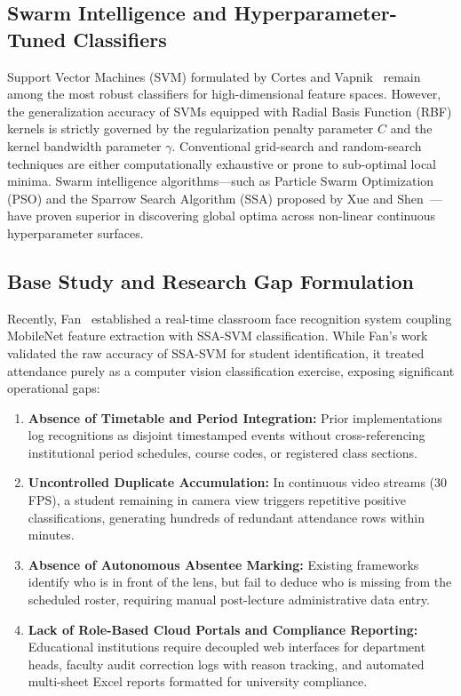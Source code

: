 \documentclass[conference]{IEEEtran}
\begin{document}
\subsection{Swarm Intelligence and Hyperparameter-Tuned Classifiers}
Support Vector Machines (SVM) formulated by Cortes and Vapnik~\cite{cortes1995support} remain among the most robust classifiers for high-dimensional feature spaces. However, the generalization accuracy of SVMs equipped with Radial Basis Function (RBF) kernels is strictly governed by the regularization penalty parameter $C$ and the kernel bandwidth parameter $\gamma$. Conventional grid-search and random-search techniques are either computationally exhaustive or prone to sub-optimal local minima. Swarm intelligence algorithms---such as Particle Swarm Optimization (PSO) and the Sparrow Search Algorithm (SSA) proposed by Xue and Shen~\cite{xue2020novel}---have proven superior in discovering global optima across non-linear continuous hyperparameter surfaces.

\subsection{Base Study and Research Gap Formulation}
Recently, Fan~\cite{fan2026classroom} established a real-time classroom face recognition system coupling MobileNet feature extraction with SSA-SVM classification. While Fan's work validated the raw accuracy of SSA-SVM for student identification, it treated attendance purely as a computer vision classification exercise, exposing significant operational gaps:
\begin{enumerate}
    \item \textbf{Absence of Timetable and Period Integration:} Prior implementations log recognitions as disjoint timestamped events without cross-referencing institutional period schedules, course codes, or registered class sections.
    \item \textbf{Uncontrolled Duplicate Accumulation:} In continuous video streams (30 FPS), a student remaining in camera view triggers repetitive positive classifications, generating hundreds of redundant attendance rows within minutes.
    \item \textbf{Absence of Autonomous Absentee Marking:} Existing frameworks identify who is in front of the lens, but fail to deduce who is missing from the scheduled roster, requiring manual post-lecture administrative data entry.
    \item \textbf{Lack of Role-Based Cloud Portals and Compliance Reporting:} Educational institutions require decoupled web interfaces for department heads, faculty audit correction logs with reason tracking, and automated multi-sheet Excel reports formatted for university compliance.
\end{enumerate}
\end{document}

